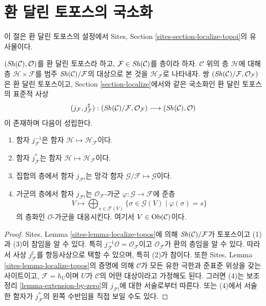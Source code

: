 \section{환 달린 토포스의 국소화}
\label{section-localize-ringed-topoi}

\noindent
이 절은 환 달린 토포스의 설정에서 Sites, Section
\ref{sites-section-localize-topoi}의 유사물이다.

\begin{lemma}
\label{lemma-localize-ringed-topos}
$(\mathop{\mathit{Sh}}\nolimits(\mathcal{C}), \mathcal{O})$를 환 달린 토포스라 하고,
$\mathcal{F} \in \mathop{\mathit{Sh}}\nolimits(\mathcal{C})$를 층이라 하자. $\mathcal{C}$ 위의 층
$\mathcal{H}$에 대해 층 $\mathcal{H} \times \mathcal{F}$를 범주
$\mathop{\mathit{Sh}}\nolimits(\mathcal{C})/\mathcal{F}$의 대상으로 본 것을
$\mathcal{H}_\mathcal{F}$로 나타내자. 쌍
$(\mathop{\mathit{Sh}}\nolimits(\mathcal{C})/\mathcal{F}, \mathcal{O}_\mathcal{F})$
은 환 달린 토포스이고, Section \ref{section-localize}에서와 같은
국소화인 환 달린 토포스의 표준적 사상
$$
(j_\mathcal{F}, j_\mathcal{F}^\sharp) :
(\mathop{\mathit{Sh}}\nolimits(\mathcal{C})/\mathcal{F}, \mathcal{O}_\mathcal{F})
\longrightarrow
(\mathop{\mathit{Sh}}\nolimits(\mathcal{C}), \mathcal{O})
$$
이 존재하며 다음이 성립한다.
\begin{enumerate}
\item 함자 $j_\mathcal{F}^{-1}$은 함자
$\mathcal{H} \mapsto \mathcal{H}_\mathcal{F}$이다.
\item 함자 $j_\mathcal{F}^*$는 함자
$\mathcal{H} \mapsto \mathcal{H}_\mathcal{F}$이다.
\item 집합의 층에서 함자 $j_{\mathcal{F}!}$는 망각 함자
$\mathcal{G}/\mathcal{F} \mapsto \mathcal{G}$이다.
\item 가군의 층에서 함자 $j_{\mathcal{F}!}$는
$\mathcal{O}_\mathcal{F}$-가군 $\varphi : \mathcal{G} \to \mathcal{F}$에
준층
$$
V \longmapsto
\bigoplus\nolimits_{s \in \mathcal{F}(V)}
\{\sigma \in \mathcal{G}(V) \mid \varphi(\sigma) = s \}
$$
의 층화인 $\mathcal{O}$-가군을 대응시킨다. 여기서
$V \in \mathop{\mathrm{Ob}}\nolimits(\mathcal{C})$이다.
\end{enumerate}
\end{lemma}

\begin{proof}
Sites, Lemma \ref{sites-lemma-localize-topos}에 의해
$\mathop{\mathit{Sh}}\nolimits(\mathcal{C})/\mathcal{F}$가 토포스이고 (1)과 (3)이 참임을 알 수
있다. 특히 $j_\mathcal{F}^{-1}\mathcal{O} = \mathcal{O}_\mathcal{F}$이고
$\mathcal{O}_\mathcal{F}$가 환의 층임을 알 수 있다. 따라서 사상
$j_\mathcal{F}^\sharp$를 항등사상으로 택할 수 있으며, 특히 (2)가 참이다.
또한 Sites, Lemma \ref{sites-lemma-localize-topos}의 증명에 의해
$\mathcal{C}$가 모든 유한 극한과 준표준 위상을 갖는 사이트이고,
$\mathcal{F} = h_U$이며 $U$가 $\mathcal{C}$의 어떤 대상이라고 가정해도
된다. 그러면 (4)는 보조정리 \ref{lemma-extension-by-zero}의
$j_{\mathcal{F}!}$에 대한 서술로부터 따른다. 또는 (4)에서 서술한 함자가
$j_\mathcal{F}^*$의 왼쪽 수반임을 직접 보일 수도 있다.
\end{proof}

